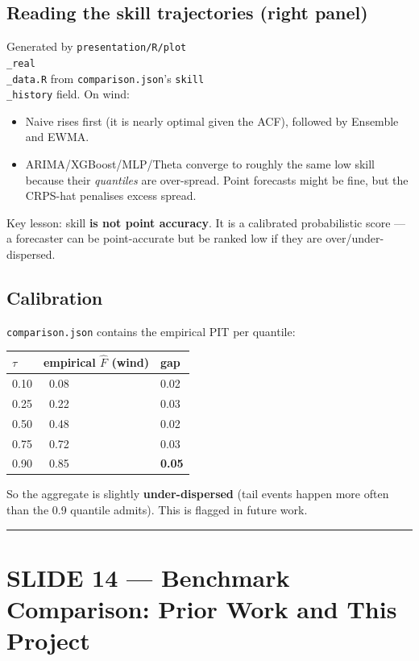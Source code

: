 \documentclass[11pt]{article}
\begin{document}
\subsection{Reading the skill trajectories (right panel)}


Generated by \texttt{presentation/R/plot\\_real\\_data.R} from \texttt{comparison.json}'s \texttt{skill\\_history} field. On wind:

\begin{itemize}
\item Naive rises first (it is nearly optimal given the ACF), followed by Ensemble and EWMA.
\item ARIMA/XGBoost/MLP/Theta converge to roughly the same low skill because their \emph{quantiles} are over-spread. Point forecasts might be fine, but the CRPS-hat penalises excess spread.
\end{itemize}

Key lesson: skill \textbf{is not point accuracy}. It is a calibrated probabilistic score --- a forecaster can be point-accurate but be ranked low if they are over/under-dispersed.

\subsection{Calibration}


\texttt{comparison.json} contains the empirical PIT per quantile:

\begin{center}
\begin{tabular}{lll}
\toprule
$\tau$ & empirical $\hat F$ (wind) & gap \\
\midrule
0.10 & ~0.08 & 0.02 \\
0.25 & ~0.22 & 0.03 \\
0.50 & ~0.48 & 0.02 \\
0.75 & ~0.72 & 0.03 \\
0.90 & ~0.85 & \textbf{0.05} \\
\bottomrule
\end{tabular}
\end{center}

So the aggregate is slightly \textbf{under-dispersed} (tail events happen more often than the 0.9 quantile admits). This is flagged in future work.

\bigskip\hrule\bigskip

\section{SLIDE 14 --- Benchmark Comparison: Prior Work and This Project}
\end{document}
